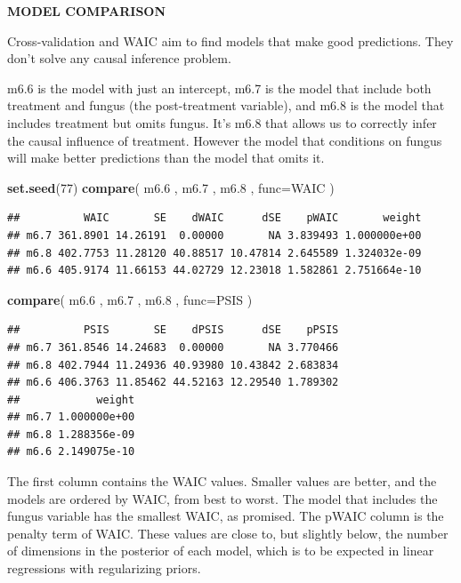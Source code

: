 \documentclass[
]{article}
\newenvironment{Shaded}{\begin{snugshade}}{\end{snugshade}}
\newcommand{\DataTypeTok}[1]{\textcolor[rgb]{0.13,0.29,0.53}{#1}}
\newcommand{\DecValTok}[1]{\textcolor[rgb]{0.00,0.00,0.81}{#1}}
\newcommand{\FloatTok}[1]{\textcolor[rgb]{0.00,0.00,0.81}{#1}}
\newcommand{\KeywordTok}[1]{\textcolor[rgb]{0.13,0.29,0.53}{\textbf{#1}}}
\newcommand{\NormalTok}[1]{#1}
\begin{document}
\textbf{MODEL COMPARISON}

Cross-validation and WAIC aim to find models that make good predictions.
They don't solve any causal inference problem.

m6.6 is the model with just an intercept, m6.7 is the model that include
both treatment and fungus (the post-treatment variable), and m6.8 is the
model that includes treatment but omits fungus. It's m6.8 that allows us
to correctly infer the causal influence of treatment. However the model
that conditions on fungus will make better predictions than the model
that omits it.

\begin{Shaded}
\begin{Highlighting}[]
\KeywordTok{set.seed}\NormalTok{(}\DecValTok{77}\NormalTok{)}
\KeywordTok{compare}\NormalTok{( m6}\FloatTok{.6}\NormalTok{ , m6}\FloatTok{.7}\NormalTok{ , m6}\FloatTok{.8}\NormalTok{ , }\DataTypeTok{func=}\NormalTok{WAIC )}
\end{Highlighting}
\end{Shaded}

\begin{verbatim}
##          WAIC       SE    dWAIC      dSE    pWAIC       weight
## m6.7 361.8901 14.26191  0.00000       NA 3.839493 1.000000e+00
## m6.8 402.7753 11.28120 40.88517 10.47814 2.645589 1.324032e-09
## m6.6 405.9174 11.66153 44.02729 12.23018 1.582861 2.751664e-10
\end{verbatim}

\begin{Shaded}
\begin{Highlighting}[]
\KeywordTok{compare}\NormalTok{( m6}\FloatTok{.6}\NormalTok{ , m6}\FloatTok{.7}\NormalTok{ , m6}\FloatTok{.8}\NormalTok{ , }\DataTypeTok{func=}\NormalTok{PSIS )}
\end{Highlighting}
\end{Shaded}

\begin{verbatim}
##          PSIS       SE    dPSIS      dSE    pPSIS
## m6.7 361.8546 14.24683  0.00000       NA 3.770466
## m6.8 402.7944 11.24936 40.93980 10.43842 2.683834
## m6.6 406.3763 11.85462 44.52163 12.29540 1.789302
##            weight
## m6.7 1.000000e+00
## m6.8 1.288356e-09
## m6.6 2.149075e-10
\end{verbatim}

The first column contains the WAIC values. Smaller values are better,
and the models are ordered by WAIC, from best to worst. The model that
includes the fungus variable has the smallest WAIC, as promised. The
pWAIC column is the penalty term of WAIC. These values are close to, but
slightly below, the number of dimensions in the posterior of each model,
which is to be expected in linear regressions with regularizing priors.
\end{document}
